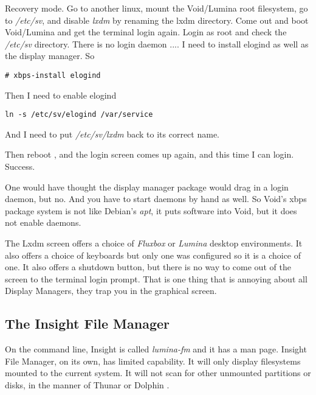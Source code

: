 \documentclass{article}  %
\begin{document}
Recovery mode. Go to another linux, mount the Void/Lumina root filesystem, go to {\em /etc/sv}, and disable {\em lxdm} by renaming the lxdm directory. Come out  and boot Void/Lumina and get the terminal login again. Login as root and check the {\em /etc/sv} directory. There is no login daemon .... I need to install elogind as well as the display manager. So
{\begin{verbatim}
# xbps-install elogind
\end{verbatim}
Then I need to enable elogind
\begin{verbatim}
ln -s /etc/sv/elogind /var/service
\end{verbatim}
And I need to put {\em /etc/sv/lxdm} back to its correct name.

Then reboot , and the login screen comes up again, and this time I can login. Success.

One would have thought the display manager package would drag in a login daemon, but no. And you have to start daemons by hand as well. So Void's xbps package system is not like Debian's {\em apt}, it puts software into Void, but it does not enable daemons.

The Lxdm screen offers a choice of {\em Fluxbox} or {\em Lumina} desktop environments. It also offers a choice of keyboards but only one was configured so it is a choice of one.  It also offers a shutdown button, but there is no way to come out of the screen to the terminal login prompt. That is one thing that is annoying about all Display Managers, they trap you in the graphical screen.



\subsection{The Insight File Manager}
On the command line, Insight is called {\em lumina-fm} and it has a man page. 
Insight File Manager, on its own,   has limited capability. It will only display filesystems mounted to the current system. It will not scan for other unmounted partitions or disks, in the manner of  Thunar or Dolphin . 

}
\end{document}
